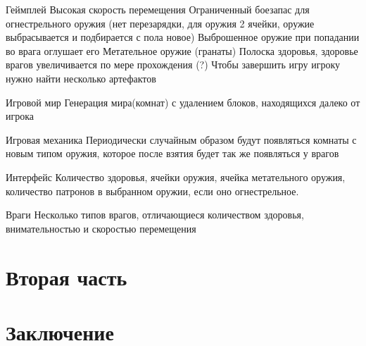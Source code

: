 \documentclass[14pt, titlepage,fleqn,a4paper]{extarticle}
\begin{document}
	Геймплей
Высокая скорость перемещения
Ограниченный боезапас для огнестрельного оружия (нет перезарядки, для оружия 2 ячейки, оружие выбрасывается и подбирается с пола новое)
Выброшенное оружие при попадании во врага оглушает его
Метательное оружие (гранаты)
Полоска здоровья, здоровье врагов увеличивается по мере прохождения
(?) Чтобы завершить игру игроку нужно найти несколько артефактов

Игровой мир
Генерация мира(комнат) с удалением блоков, находящихся далеко от игрока 

Игровая механика
Периодически случайным образом будут появляться комнаты с новым типом оружия, которое после взятия будет так же появляться у врагов

Интерфейс
Количество здоровья, ячейки оружия, ячейка метательного оружия, количество патронов в выбранном оружии, если оно огнестрельное.

Враги
Несколько типов врагов, отличающиеся количеством здоровья, внимательностью и скоростью перемещения
	
	\section*{Вторая часть}
	
	\section*{Заключение}
    
\end{document}
